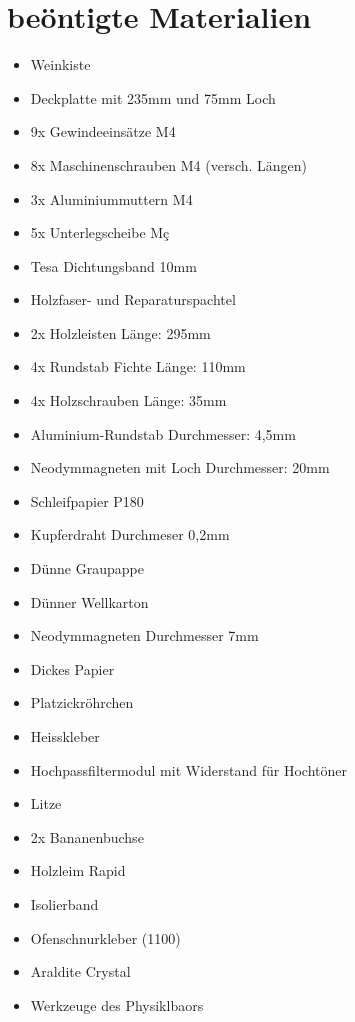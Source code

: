\documentclass[a4paper,11pt]{report}
\begin{document}
\section{beöntigte Materialien}
\begin{multicols}{2}
    \begin{itemize}[parsep=0pt]
        \item Weinkiste
        \item Deckplatte mit 235mm und 75mm Loch
        \item 9x Gewindeeinsätze M4
        \item 8x Maschinenschrauben M4 (versch. Längen)
        \item 3x Aluminiummuttern M4
        \item 5x Unterlegscheibe Mç
        \item Tesa Dichtungsband 10mm
        \item Holzfaser- und Reparaturspachtel
        \item 2x Holzleisten Länge: 295mm
        \item 4x Rundstab Fichte Länge: 110mm
        \item 4x Holzschrauben Länge: 35mm
        \item Aluminium-Rundstab Durchmesser: 4,5mm
        \item Neodymmagneten mit Loch Durchmesser: 20mm
        \item Schleifpapier P180
        \item Kupferdraht Durchmeser 0,2mm
        \item Dünne Graupappe
        \item Dünner Wellkarton
        \item Neodymmagneten Durchmesser 7mm
        \item Dickes Papier
        \item Platzickröhrchen
        \item Heisskleber
        \item Hochpassfiltermodul mit Widerstand für Hochtöner
        \item Litze
        \item 2x Bananenbuchse
        \item Holzleim Rapid
        \item Isolierband
        \item Ofenschnurkleber (1100\textdegree)
        \item Araldite Crystal
        \item Werkzeuge des Physiklbaors
    \end{itemize}
\end{multicols}
\end{document}
